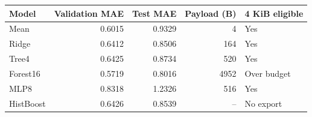 \begin{tabular}{lrrrl}
\toprule
Model & Validation MAE & Test MAE & Payload (B) & 4 KiB eligible \\
\midrule
Mean & 0.6015 & 0.9329 & 4 & Yes \\
Ridge & 0.6412 & 0.8506 & 164 & Yes \\
Tree4 & 0.6425 & 0.8734 & 520 & Yes \\
Forest16 & 0.5719 & 0.8016 & 4952 & Over budget \\
MLP8 & 0.8318 & 1.2326 & 516 & Yes \\
HistBoost & 0.6426 & 0.8539 & -- & No export \\
\bottomrule
\end{tabular}